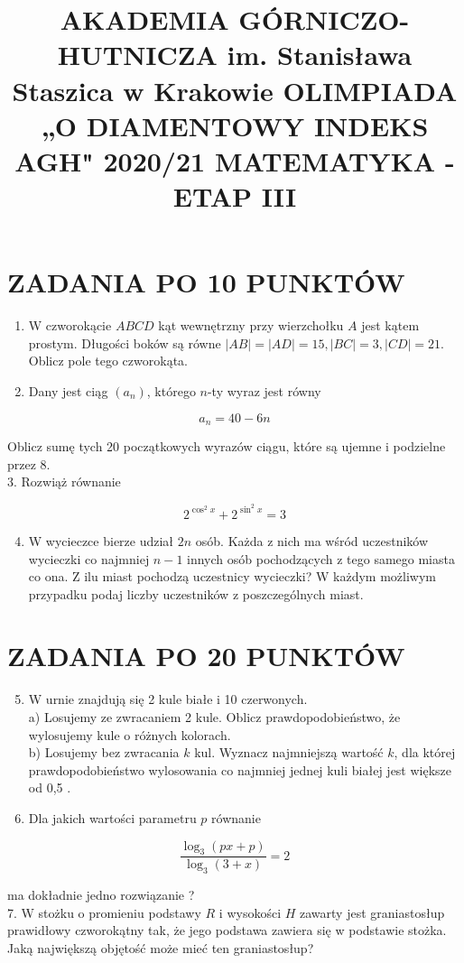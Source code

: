 \documentclass[10pt]{article}
\title{AKADEMIA GÓRNICZO-HUTNICZA im. Stanisława Staszica w Krakowie OLIMPIADA „O DIAMENTOWY INDEKS AGH" 2020/21 MATEMATYKA - ETAP III }
\author{}
\date{}
\begin{document}
\maketitle
\section*{ZADANIA PO 10 PUNKTÓW}
\begin{enumerate}
  \item W czworokącie $A B C D$ kąt wewnętrzny przy wierzchołku $A$ jest kątem prostym. Długości boków są równe $|A B|=|A D|=15,|B C|=3,|C D|=21$. Oblicz pole tego czworokąta.
  \item Dany jest ciąg $\left(a_{n}\right)$, którego $n$-ty wyraz jest równy
\end{enumerate}

$$
a_{n}=40-6 n
$$

Oblicz sumę tych 20 początkowych wyrazów ciągu, które są ujemne i podzielne przez 8.\\
3. Rozwiąż równanie

$$
2^{\cos ^{2} x}+2^{\sin ^{2} x}=3
$$

\begin{enumerate}
  \setcounter{enumi}{3}
  \item W wycieczce bierze udział $2 n$ osób. Każda z nich ma wśród uczestników wycieczki co najmniej $n-1$ innych osób pochodzących z tego samego miasta co ona. Z ilu miast pochodzą uczestnicy wycieczki? W każdym możliwym przypadku podaj liczby uczestników z poszczególnych miast.
\end{enumerate}

\section*{ZADANIA PO 20 PUNKTÓW}
\begin{enumerate}
  \setcounter{enumi}{4}
  \item W urnie znajdują się 2 kule białe i 10 czerwonych.\\
a) Losujemy ze zwracaniem 2 kule. Oblicz prawdopodobieństwo, że wylosujemy kule o różnych kolorach.\\
b) Losujemy bez zwracania $k$ kul. Wyznacz najmniejszą wartość $k$, dla której prawdopodobieństwo wylosowania co najmniej jednej kuli białej jest większe od 0,5 .
  \item Dla jakich wartości parametru $p$ równanie
\end{enumerate}

$$
\frac{\log _{3}(p x+p)}{\log _{3}(3+x)}=2
$$

ma dokładnie jedno rozwiązanie ?\\
7. W stożku o promieniu podstawy $R$ i wysokości $H$ zawarty jest graniastosłup prawidłowy czworokątny tak, że jego podstawa zawiera się w podstawie stożka. Jaką największą objętość może mieć ten graniastosłup?
\end{document}
